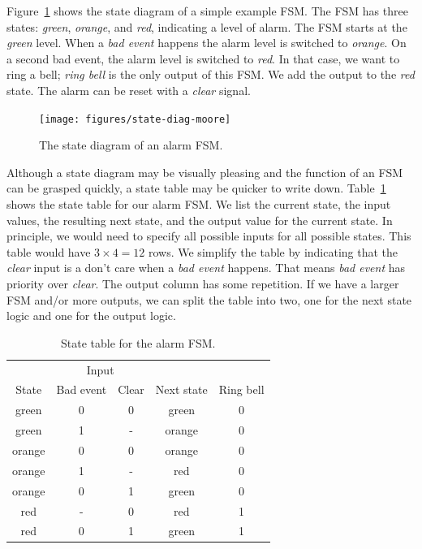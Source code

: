 \documentclass[%
    10pt,
    headinclude, footexclude,
    openright, %
    notitlepage,
    cleardoubleempty,
    headsepline,
    pointlessnumbers,
    bibtotoc, idxtotoc,
    ]{scrbook}
\begin{document}
Figure~\ref{fig:diag-moore} shows the state diagram of a simple example FSM.
The FSM has three states: \emph{green}, \emph{orange}, and \emph{red},
indicating a level of alarm. The FSM starts at the \emph{green} level.
When a \emph{bad event} happens the alarm level is switched to \emph{orange}.
On a second bad event, the alarm level is switched to \emph{red}.
In that case, we want to ring a bell; \emph{ring bell} is the only output of this FSM.
We add the output to the \emph{red} state.
The alarm can be reset with a \emph{clear} signal.

\begin{figure}
  \centering
  \texttt{[image: figures/state-diag-moore]}
  \caption{The state diagram of an alarm FSM.}
  \label{fig:diag-moore}
\end{figure}

Although a state diagram may be visually pleasing and the function of an FSM
can be grasped quickly, a state table may be quicker to write down.
Table~\ref{tab:state:table} shows the state table for our alarm FSM.
We list the current state, the input values, the resulting next state, and
the output value for the current state. In principle, we would need to
specify all possible inputs for all possible states. This table would have
$3 \times 4 = 12$ rows. We simplify the table by indicating that the \emph{clear}
input is a don't care when a \emph{bad event} happens. That means
\emph{bad event} has priority over \emph{clear}. The output column
has some repetition. If we have a larger FSM and/or more outputs, we
can split the table into two, one for the next state logic and one for the
output logic.

\begin{table}
\centering
\caption{State table for the alarm FSM.}
\begin{tabular}{ccccc}
\toprule
& \multicolumn{2}{c}{Input} \\
\cmidrule{2-3}
State &  Bad event & Clear & Next state & Ring bell \\
\midrule
green & 0 & 0 & green & 0 \\
green & 1 & - & orange & 0 \\
orange & 0 & 0 & orange & 0 \\
orange & 1 & - & red & 0 \\
orange & 0 & 1 & green & 0 \\
red & - & 0 & red & 1 \\
red & 0 & 1 & green & 1 \\
\bottomrule
\end{tabular}
\label{tab:state:table}
\end{table}
\end{document}
